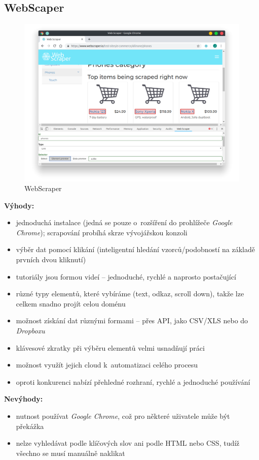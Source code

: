 \documentclass[thesis=B,czech]{FITthesis}[2012/06/26]
\begin{document}
\newpage
\subsection{WebScaper}
\begin{figure}
	\includegraphics[width=\linewidth]{images/WebScraper.png}
	\caption{WebScraper}
	\label{fig:webScraper}
\end{figure}
\textbf{Výhody:}
\begin{itemize}
	\item jednoduchá instalace (jedná se pouze o~rozšíření do prohlížeče \emph{Google Chrome}); scrapování probíhá skrze vývojářskou konzoli
	\item výběr dat pomocí klikání (inteligentní hledání vzorců/podobností na základě prvních dvou kliknutí)
	\item tutoriály jsou formou videí -- jednoduché, rychlé a naprosto postačující
	\item různé typy elementů, které vybíráme (text, odkaz, scroll down), takže lze celkem snadno projít celou doménu
	\item možnost získání dat různými formami -- přes API, jako CSV/XLS nebo do \emph{Dropboxu}
	\item klávesové zkratky při výběru elementů velmi usnadňují práci
	\item možnost využít jejich cloud k~automatizaci celého procesu
	\item oproti konkurenci nabízí přehledné rozhraní, rychlé a jednoduché používání
\end{itemize}
\textbf{Nevýhody:}
\begin{itemize}
	\item nutnost používat \emph{Google Chrome}, což pro některé uživatele může být překážka
	\item nelze vyhledávat podle klíčových slov ani podle HTML nebo CSS, tudíž všechno se musí manuálně naklikat
\end{itemize}
\end{document}
